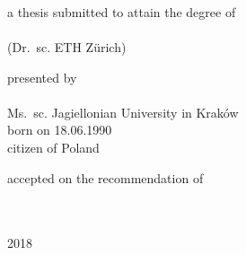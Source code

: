 
\begin{titlepage}

\begin{addmargin}[-1cm]{-3cm}
\begin{center}
\large

\hfill
\vfill


\vfill

\begingroup
\color{Maroon}
\\
\medskip
\\
\medskip
{} \\
\bigskip %
\endgroup

\vfill

a thesis submitted to attain the degree of \\
\bigskip
{} \\
\smallskip
{\small (Dr.\ sc. ETH Zürich)}

\vfill

presented by \\
\bigskip
\spacedallcaps{\myName} \\
\bigskip
{\small Ms.\ sc. Jagiellonian University in Kraków \\
\smallskip
born on 18.06.1990 \\
\smallskip
citizen of Poland}

\vfill

accepted on the recommendation of \\
\bigskip
{} \\
\smallskip
{} \\
\smallskip
{}

\vfill

2018

\vfill

\end{center}
\end{addmargin}

\end{titlepage}
